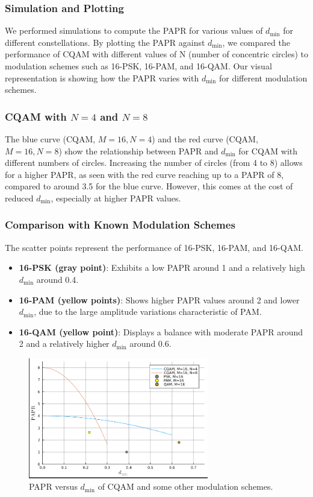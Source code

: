 \documentclass[11pt,a4paper,oneside]{article}
\begin{document}
\subsubsection{Simulation and Plotting}
We performed simulations to compute the PAPR for various values of $d_{\text{min}}$ for different constellations.
By plotting the PAPR against $d_{\text{min}}$, we compared the performance of CQAM with different values of N (number of concentric circles) to 
modulation schemes such as 16-PSK, 16-PAM, and 16-QAM.
Our visual representation is showing how the PAPR varies with $d_{\text{min}}$ for different modulation schemes.

\subsubsection{CQAM with \(N=4\) and \(N=8\)}
The blue curve (CQAM, \(M=16, N=4\)) and the red curve (CQAM, \(M=16, N=8\)) show the relationship between PAPR and \(d_{\text{min}}\)
for CQAM with different numbers of circles. Increasing the number of circles (from 4 to 8) allows for a higher PAPR, as seen with the red curve reaching up to a PAPR of 8,
compared to around 3.5 for the blue curve. However, this comes at the cost of reduced \(d_{\text{min}}\), especially at higher PAPR values.

\subsubsection{Comparison with Known Modulation Schemes}
The scatter points represent the performance of 16-PSK, 16-PAM, and 16-QAM.
\begin{itemize}
    \item \textbf{16-PSK (gray point)}: Exhibits a low PAPR around 1 and a relatively high \(d_{\text{min}}\) around 0.4.
    \item \textbf{16-PAM (yellow points)}: Shows higher PAPR values around 2 and lower \(d_{\text{min}}\), due to the large amplitude variations characteristic of PAM.
    \item \textbf{16-QAM (yellow point)}: Displays a balance with moderate PAPR around 2 and a relatively higher \(d_{\text{min}}\) around 0.6.
\end{itemize}

\begin{figure}[H]
    \centering
    \includegraphics[width=0.7\textwidth]{plot_fig1.png}
    \caption{PAPR versus $d_{\text{min}}$ of CQAM and some other modulation schemes.}
    \label{fig:papr_vs_dmin}
\end{figure}
\end{document}
